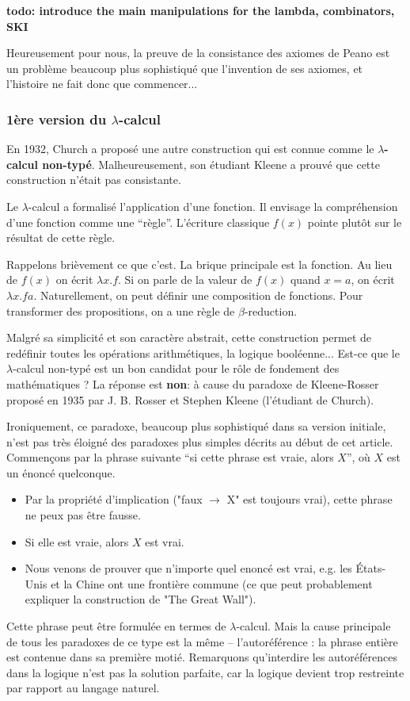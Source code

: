\documentclass[12pt, a4paper]{article}
\begin{document}
\textbf{todo: introduce the main manipulations for the lambda, combinators, SKI}

Heureusement pour nous, la preuve de la consistance des axiomes de Peano est un problème beaucoup plus sophistiqué que l'invention de ses axiomes, et l'histoire ne fait donc que commencer...

\subsubsection*{1ère version du $\lambda$-calcul}
En 1932, Church a proposé une autre construction qui est connue comme le \textbf{$\lambda$-calcul non-typé}. Malheureusement, son étudiant Kleene a prouvé que cette construction n'était pas consistante.

Le $\lambda$-calcul a formalisé l'application d'une fonction. Il envisage la compréhension d'une fonction comme une ``règle''. L'écriture classique $f(x)$ pointe plutôt sur le résultat de cette règle.

Rappelons brièvement ce que c'est.
La brique principale est la fonction.
Au lieu de $f(x)$ on écrit $\lambda x.f$.
Si on parle de la valeur de $f(x)$ quand $x=a$, on écrit $\lambda x.f a$.
Naturellement, on peut définir une composition de fonctions.
Pour transformer des propositions, on a une règle de $\beta$-reduction.

Malgré sa simplicité et son caractère abstrait, cette construction permet de redéfinir toutes les opérations arithmétiques, la logique booléenne...
Est-ce que le $\lambda$-calcul non-typé est un bon candidat pour le rôle de fondement des mathématiques ?
La réponse est \textbf{non}: à cause du paradoxe de Kleene-Rosser proposé en 1935 par J. B. Rosser et Stephen Kleene (l'étudiant de Church).

Ironiquement, ce paradoxe, beaucoup plus sophistiqué dans sa version initiale, n'est pas très éloigné des paradoxes plus simples décrits au début de cet article.
Commençons par la phrase suivante ``si cette phrase est vraie, alors $X$'', où $X$ est un énoncé quelconque.
\begin{itemize}
	\item Par la propriété d'implication ("faux $\to$ X" est toujours vrai), cette phrase ne peux pas être fausse.
	\item Si elle est vraie, alors $X$ est vrai.
	\item Nous venons de prouver que n'importe quel enoncé est vrai, e.g. les États-Unis et la Chine ont une frontière commune (ce que peut probablement expliquer la construction de "The Great Wall").
\end{itemize}
Cette phrase peut être formulée en termes de $\lambda$-calcul.
Mais la cause principale de tous les paradoxes de ce type est la même -- l'autoréférence : la phrase entière est contenue dans sa première motié.
Remarquons qu'interdire les autoréférences dans la logique n'est pas la solution parfaite, car la logique devient trop restreinte par rapport au langage naturel.
\end{document}
